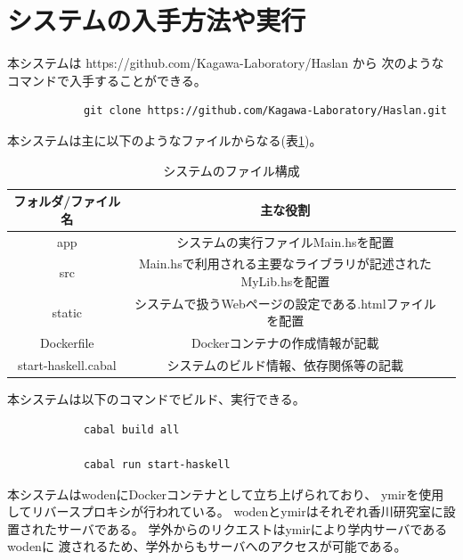 \documentclass{cssspaper}
\begin{document}
        \section{システムの入手方法や実行}
        本システムは https://github.com/Kagawa-Laboratory/Haslan から
        次のようなコマンドで入手することができる。
        \begin{lstlisting}
            git clone https://github.com/Kagawa-Laboratory/Haslan.git
        \end{lstlisting}

        本システムは主に以下のようなファイルからなる(表\ref{table:file})。
        \begin{table}[h]
            \caption{システムのファイル構成}
            \label{table:file}
            \centering
            \begin{tabular}{ccc}
              \hline
              フォルダ/ファイル名     & 主な役割                              \\
              \hline
              app    &   システムの実行ファイルMain.hsを配置   \\
              \hline
              src    & Main.hsで利用される主要なライブラリが記述されたMyLib.hsを配置        \\
              \hline
              static    & システムで扱うWebページの設定である.htmlファイルを配置                                \\
              \hline
              Dockerfile    & Dockerコンテナの作成情報が記載                 \\
              \hline
              start-haskell.cabal    & システムのビルド情報、依存関係等の記載          \\
              \hline 
            \end{tabular}
        \end{table}

        本システムは以下のコマンドでビルド、実行できる。
        \begin{lstlisting}
            cabal build all

            cabal run start-haskell
        \end{lstlisting}

        本システムはwodenにDockerコンテナとして立ち上げられており、
        ymirを使用してリバースプロキシが行われている。
        wodenとymirはそれぞれ香川研究室に設置されたサーバである。
        学外からのリクエストはymirにより学内サーバであるwodenに
        渡されるため、学外からもサーバへのアクセスが可能である。
\end{document}
